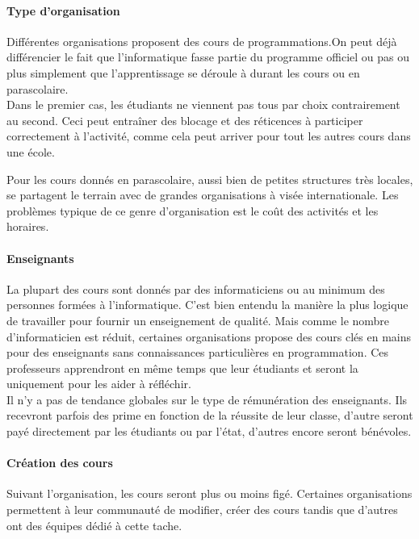 \paragraph{Type d'organisation}
Différentes organisations proposent des cours de programmations.On peut déjà différencier le fait que l'informatique fasse partie du programme officiel ou pas ou plus simplement que l'apprentissage se déroule à durant les cours ou en parascolaire.\\

Dans le premier cas, les étudiants ne viennent pas tous par choix contrairement au second. Ceci peut entraîner des blocage et des réticences à participer correctement à l'activité, comme cela peut arriver pour tout les autres cours dans une école.

Pour les cours donnés en parascolaire, aussi bien de petites structures très locales, se partagent le terrain avec de grandes organisations à visée internationale. Les problèmes typique de ce genre d'organisation est le coût des activités et les horaires.

\paragraph{Enseignants}
La plupart des cours sont donnés par des informaticiens ou au minimum des personnes formées à l'informatique. C'est bien entendu la manière la plus logique de travailler pour fournir un enseignement de qualité. Mais comme le nombre d'informaticien est réduit, certaines organisations propose des cours clés en mains pour des enseignants sans connaissances particulières en programmation. Ces professeurs apprendront en même temps que leur étudiants et seront la uniquement pour les aider à réfléchir.\\

Il n'y a pas de tendance globales sur le type de rémunération des enseignants. Ils recevront parfois des prime en fonction de la réussite de leur classe, d'autre seront payé directement par les étudiants ou par l'état, d'autres encore seront bénévoles.

\paragraph{Création des cours}
Suivant l'organisation, les cours seront plus ou moins figé. Certaines organisations permettent à leur communauté de modifier, créer des cours tandis que d'autres ont des équipes dédié à cette tache.


